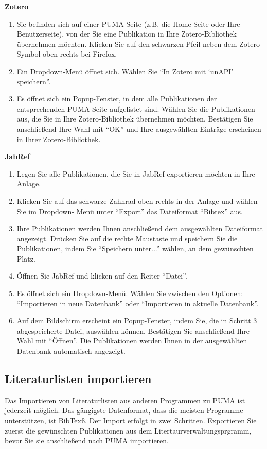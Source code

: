 \documentclass[b5paper,11pt,twoside]{scrbook} %
\begin{document}
\textbf{Zotero}
\begin{enumerate}
    \item Sie befinden sich auf einer PUMA-Seite (z.B. die Home-Seite oder Ihre Benutzerseite), von der Sie eine Publikation in Ihre Zotero-Bibliothek übernehmen möchten. Klicken Sie auf den schwarzen Pfeil neben dem Zotero-Symbol oben rechts bei Firefox.
    \item Ein Dropdown-Menü öffnet sich. Wählen Sie \enquote{In Zotero mit \enquote{unAPI} speichern}.
    \item Es öffnet sich ein Popup-Fenster, in dem alle Publikationen der entsprechenden PUMA-Seite aufgelistet sind. Wählen Sie die Publikationen aus, die Sie in Ihre Zotero-Bibliothek übernehmen möchten. Bestätigen Sie anschließend Ihre Wahl mit \enquote{OK} und Ihre ausgewählten Einträge erscheinen in Ihrer Zotero-Bibliothek.
\end{enumerate} 
\textbf{JabRef}
\begin{enumerate}
    \item Legen Sie alle Publikationen, die Sie in JabRef exportieren möchten in Ihre Anlage.
    \item Klicken Sie auf das schwarze Zahnrad oben rechts in der Anlage und wählen Sie im Dropdown- Menü unter \enquote{Export} das Dateiformat \enquote{Bibtex} aus.
    \item Ihre Publikationen werden Ihnen anschließend dem ausgewählten Dateiformat angezeigt. Drücken Sie auf die rechte Maustaste und speichern Sie die Publikationen, indem Sie \enquote{Speichern unter...} wählen, an dem gewünschten Platz. 
    \item Öffnen Sie JabRef und klicken auf den Reiter \enquote{Datei}. 
    \item Es öffnet sich ein Dropdown-Menü. Wählen Sie zwischen den Optionen: \enquote{Importieren in neue Datenbank} oder \enquote{Importieren in aktuelle Datenbank}.
    \item Auf dem Bildschirm erscheint ein Popup-Fenster, indem Sie, die in Schritt 3 abgespeicherte Datei, auswählen können. Bestätigen Sie anschließend Ihre Wahl mit \enquote{Öffnen}. Die Publikationen werden Ihnen in der ausgewählten Datenbank automatisch angezeigt.
\end{enumerate}

\subsection{Literaturlisten importieren}
Das Importieren von Literaturlisten aus anderen Programmen zu PUMA ist jederzeit möglich. Das gängigste Datenformat, dass die meisten Programme unterstützen, ist BibTexß. \newline 
Der Import erfolgt in zwei Schritten. Exportieren Sie zuerst die gewünschten Publikationen aus dem Litertaurverwaltungsprgramm, bevor Sie sie anschließend nach PUMA importieren. 
\end{document}
